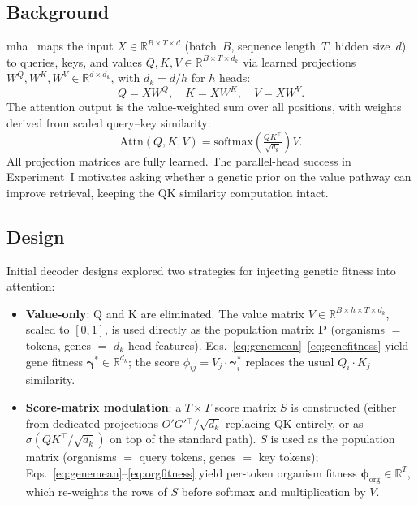 \documentclass[10pt, a4paper, twocolumn]{article}
\begin{document}
\subsection*{Background}

\Ac{mha}~\cite{vaswani2017attention} maps the input $X\in\mathbb{R}^{B\times T\times d}$ (batch~$B$, sequence length~$T$, hidden size~$d$) to queries, keys, and values $Q,K,V\in\mathbb{R}^{B\times T\times d_k}$ via learned projections $W^Q, W^K, W^V\in\mathbb{R}^{d\times d_k}$, with $d_k=d/h$ for $h$ heads:
%
\begin{equation*}
  Q = XW^Q, \quad K = XW^K, \quad V = XW^V.
\end{equation*}
%
The attention output is the value-weighted sum over all positions, with weights derived from scaled query--key similarity:
%
\begin{equation*}
  \mathrm{Attn}(Q,K,V) = \mathrm{softmax}\!\left(\tfrac{QK^\top}{\sqrt{d_k}}\right)V.
\end{equation*}
%
All projection matrices are fully learned. The parallel-head success in Experiment~I motivates asking whether a genetic prior on the value pathway can improve retrieval, keeping the QK similarity computation intact.

\subsection*{Design}

Initial decoder designs explored two strategies for injecting genetic fitness into attention:

\begin{itemize}[leftmargin=1.5em, itemsep=2pt, topsep=2pt]
  \item \textbf{Value-only}: Q and K are eliminated. The value matrix $V\in\mathbb{R}^{B\times h\times T\times d_k}$, scaled to $[0,1]$, is used directly as the population matrix $\mathbf{P}$ (organisms $=$ tokens, genes $=$ $d_k$ head features). Eqs.~\eqref{eq:genemean}--\eqref{eq:genefitness} yield gene fitness $\boldsymbol{\gamma}^*\in\mathbb{R}^{d_k}$; the score $\phi_{ij}=V_j\cdot\boldsymbol{\gamma}^*_i$ replaces the usual $Q_i\cdot K_j$ similarity.
  \item \textbf{Score-matrix modulation}: a $T\!\times\!T$ score matrix $S$ is constructed (either from dedicated projections $O'G'{}^\top/\sqrt{d_k}$ replacing QK entirely, or as $\sigma(QK^\top/\sqrt{d_k})$ on top of the standard path). $S$ is used as the population matrix (organisms $=$ query tokens, genes $=$ key tokens); Eqs.~\eqref{eq:genemean}--\eqref{eq:orgfitness} yield per-token organism fitness $\boldsymbol{\phi}_\mathrm{org}\in\mathbb{R}^T$, which re-weights the rows of $S$ before softmax and multiplication by $V$.
\end{itemize}
\end{document}
